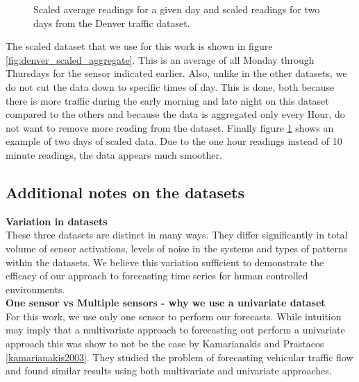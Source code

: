 \begin{figure}[h]
	\begin{center}
		\label{fig:denver_scaled_aggregate}
		\label{fig:denver_scaled_raw}
	\end{center}
	\caption{Scaled average readings for a given day and scaled readings for two days from the Denver traffic dataset.}
\end{figure}

The scaled dataset that we use for this work is shown in figure \ref{fig:denver_scaled_aggregate}.  This is an average of all Monday through Thursdays for the sensor indicated earlier.  Also, unlike in the other datasets, we do not cut the data down to specific times of day.  This is done, both because there is more traffic during the early morning and late night on this dataset compared to the others and because the data is aggregated only every Hour, do not want to remove more reading from the dataset.  Finally figure \ref{fig:denver_scaled_raw} shows an example of two days of scaled data.  Due to the one hour readings instead of 10 minute readings, the data appears much smoother.  

\subsection{Additional notes on the datasets} 

\noindent
\textbf{Variation in datasets} \\
These three datasets are distinct in many ways.  They differ significantly in total volume of sensor activations, levels of noise in the systems and types of patterns within the datasets.  We believe this variation sufficient to demonstrate the efficacy of our approach to forecasting time series for human controlled environments. \\

\noindent
\textbf{One sensor vs Multiple sensors - why we use a univariate dataset} \\
For this work, we use only one sensor to perform our forecasts.  While intuition may imply that a multivariate approach to forecasting out perform a univariate approach this was show to not be the case by Kamarianakis and Prastacos \ref{kamarianakis2003}.  They studied the problem of forecasting vehicular traffic flow and found similar results using both multivariate and univariate approaches.

